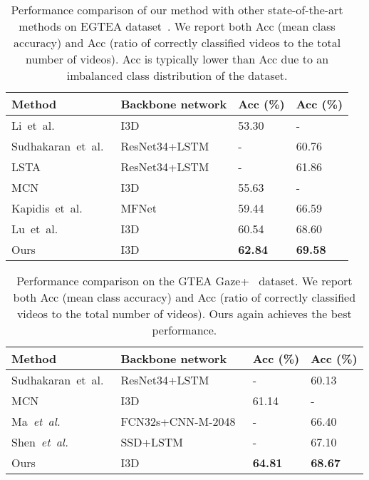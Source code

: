 \documentclass[10pt,twocolumn,letterpaper]{article}
\begin{document}
\begin{table*}[t]
\centering
\begin{tabular}{L{4.6cm}|L{4.6cm}|C{2.3cm}|C{2.3cm}}
\toprule
Method & Backbone network & Acc (\%) & Acc (\%) \\ \midrule
Li~et~al.~\cite{li2018eye} & I3D~\cite{carreira2017quo} & 53.30 & - \\
Sudhakaran~et~al.~\cite{sudhakaran2018attention} & ResNet34+LSTM~\cite{he2016deep,xingjian2015convolutional} & - & 60.76 \\
LSTA~\cite{sudhakaran2019lsta} & ResNet34+LSTM~\cite{he2016deep,xingjian2015convolutional} & - & 61.86 \\
MCN~\cite{huang2019mutual} & I3D~\cite{carreira2017quo} & 55.63 & - \\
Kapidis~et~al.~\cite{kapidis2019multitask} & MFNet~\cite{chen2018multi} & 59.44 & 66.59 \\
Lu~et~al.~\cite{lu2019learning} & I3D~\cite{carreira2017quo} & 60.54 & 68.60 \\ \midrule
Ours & I3D~\cite{carreira2017quo} & \textbf{62.84} & \textbf{69.58} \\
\bottomrule
\end{tabular}
\caption{Performance comparison of our method with other state-of-the-art methods on EGTEA dataset~\cite{li2018eye}. We report both Acc (mean class accuracy) and Acc (ratio of correctly classified videos to the total number of videos). Acc is typically lower than Acc due to an imbalanced class distribution of the dataset.}
\label{tab:act}
\end{table*}

\begin{table*}[t]
\centering
\begin{tabular}{L{4.6cm}|L{4.6cm}|C{2.3cm}|C{2.3cm}}
\toprule
Method & Backbone network & Acc (\%) & Acc (\%) \\ \midrule
Sudhakaran~et~al.~\cite{sudhakaran2018attention} & ResNet34+LSTM~\cite{he2016deep,xingjian2015convolutional} & - & 60.13 \\
MCN~\cite{huang2019mutual} & I3D~\cite{carreira2017quo} & 61.14 & - \\
Ma~\textit{et~al.}~\cite{ma2016going} & FCN32s+CNN-M-2048~\cite{long2015fully,chatfield2014return} & - & 66.40 \\
Shen~\textit{et~al.}~\cite{shen2018egocentric} & SSD+LSTM~\cite{liu2016ssd} & - & 67.10 \\
\midrule
Ours & I3D~\cite{carreira2017quo} & \textbf{64.81} & \textbf{68.67} \\
\bottomrule
\end{tabular}
\caption{Performance comparison on the GTEA Gaze+~\cite{li2015delving} dataset. We report both Acc (mean class accuracy) and Acc (ratio of correctly classified videos to the total number of videos). Ours again achieves the best performance.}
\label{tab:gtea}
\end{table*}
\end{document}
